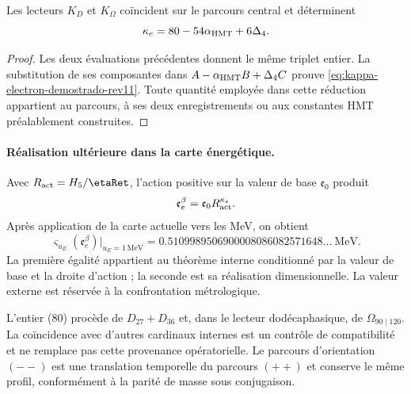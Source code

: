 \begin{theorem}
\label{thm:reduccion-electron-two-way-rev11}
Les lecteurs \(K_D\) et \(K_\Omega\) coïncident sur le parcours central et
déterminent
\begin{equation}
 \kappa_e=80-54\alpha_{\rm HMT}+6\Delta_4.
 \label{eq:kappa-electron-demostrado-rev11}
\end{equation}
\end{theorem}

\begin{proof}
Les deux évaluations précédentes donnent le même triplet entier. La substitution
de ses composantes dans
\(A-\alpha_{\rm HMT}B+\Delta_4C\) prouve
\eqref{eq:kappa-electron-demostrado-rev11}. Toute quantité employée dans cette
réduction appartient au parcours, à ses deux enregistrements ou aux constantes HMT
préalablement construites.
\end{proof}

\paragraph{Réalisation ultérieure dans la carte énergétique.}
Avec \(R_{\rm act}=H_5/\etaRet\), l'action positive sur la valeur de base
\(\mathfrak e_0\) produit
\begin{equation}
 \mathfrak e_e^\beta
 =\mathfrak e_0R_{\rm act}^{\kappa_e}.
 \label{eq:masa-electron-adimensional-two-way-rev11}
\end{equation}
Après application de la carte actuelle vers les MeV, on obtient
\begin{equation}
 \varsigma_{u_E}(\mathfrak e_e^\beta)\big|_{u_E=1\,\mathrm{MeV}}
 =0.5109989506900008086082571648\ldots\ \mathrm{MeV}.
 \label{eq:masa-electron-two-way-rev11}
\end{equation}
La première égalité appartient au théorème interne conditionné par la valeur de base et
la droite d'action ; la seconde est sa réalisation dimensionnelle. La valeur
externe est réservée à la confrontation métrologique.

L'entier (80) procède de \(D_{27}+D_{36}\) et, dans le lecteur dodécaphasique,
de \(\Omega_{90\mid120}\). La coïncidence avec d'autres cardinaux internes est
un contrôle de compatibilité et ne remplace pas cette provenance opératorielle. Le
parcours d'orientation \((--)\) est une translation temporelle du parcours \((++)\)
et conserve le même profil, conformément à la parité de masse sous conjugaison.

